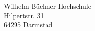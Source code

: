 \documentclass[
    version=last,           %
    DIV=13,                 %
    BCOR=0mm,               %
    paper=a4,               %
    fontsize=12pt,          %
    firsthead=on,           %
    firstfoot=on,           %
    pagenumber=on,i         %
    parskip=half,           %
    enlargefirstpage=,      %
    firsthead=on,           %
    fromrule=afteraddress,  %
    priority=off,           %
    backaddress=true,       %
    refline=dateright,      %
	fromalign=right,	    %
    fromemail=on,i          %
    fromurl=on,             %
    frombank=on,
    fromphone=on,           %
    frommobilephone=on      %
    fromlogo=on,            %
    addrfield=on,           %
    subject=untitled,  %
    foldmarks=off,          %
    numericaldate=off,      %
	pagenumber=right,	        %
	parskip=half,	        %
    headsep=false,          %
    footsepline=true,       %
    foldmarks=off,		    %
	]{scrlttr2}
\begin{document}
\begin{letter} {Wilhelm Büchner Hochschule \\
Hilpertstr. 31\\
64295 Darmstad}



\end{letter}
\end{document}
